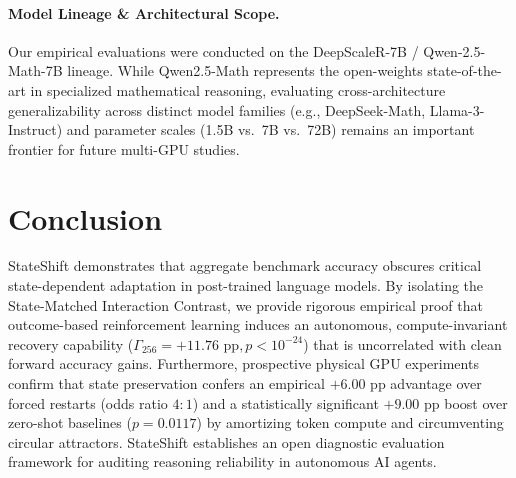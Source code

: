 \documentclass[11pt]{article}
\begin{document}
\paragraph{Model Lineage \& Architectural Scope.}
Our empirical evaluations were conducted on the DeepScaleR-7B / Qwen-2.5-Math-7B lineage. While Qwen2.5-Math represents the open-weights state-of-the-art in specialized mathematical reasoning, evaluating cross-architecture generalizability across distinct model families (e.g., DeepSeek-Math, Llama-3-Instruct) and parameter scales (1.5B vs.\ 7B vs.\ 72B) remains an important frontier for future multi-GPU studies.

\section{Conclusion}
StateShift demonstrates that aggregate benchmark accuracy obscures critical state-dependent adaptation in post-trained language models. By isolating the State-Matched Interaction Contrast, we provide rigorous empirical proof that outcome-based reinforcement learning induces an autonomous, compute-invariant recovery capability ($\Gamma_{256} = +11.76\text{ pp}, p < 10^{-24}$) that is uncorrelated with clean forward accuracy gains. Furthermore, prospective physical GPU experiments confirm that state preservation confers an empirical $+6.00\text{ pp}$ advantage over forced restarts (odds ratio $4:1$) and a statistically significant $+9.00\text{ pp}$ boost over zero-shot baselines ($p = 0.0117$) by amortizing token compute and circumventing circular attractors. StateShift establishes an open diagnostic evaluation framework for auditing reasoning reliability in autonomous AI agents.



\end{document}
